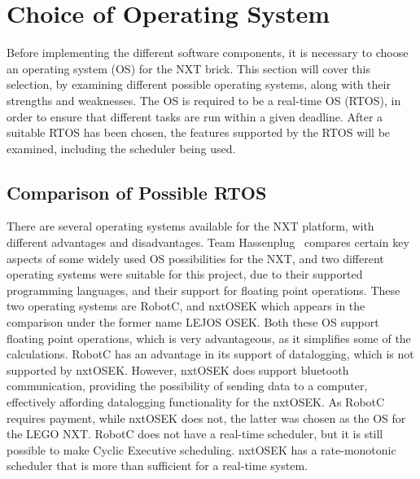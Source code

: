 \section{Choice of Operating System}\label{OS}
Before implementing the different software components, it is necessary to choose an operating system (OS) for the NXT brick. This section will cover this selection, by examining different possible operating systems, along with their strengths and weaknesses. The OS is required to be a real-time OS (RTOS), in order to ensure that different tasks are run within a given deadline. After a suitable RTOS has been chosen, the features supported by the RTOS will be examined, including the scheduler being used. 


\subsection{Comparison of Possible RTOS}\label{osek}
There are several operating systems available for the NXT platform, with different advantages and disadvantages. Team Hassenplug~\cite{OSChoice} compares certain key aspects of some widely used OS possibilities for the NXT, and two different operating systems were suitable for this project, due to their supported programming languages, and their support for floating point operations. These two operating systems are RobotC, and nxtOSEK which appears in the comparison under the former name LEJOS OSEK. Both these OS support floating point operations, which is very advantageous, as it simplifies some of the calculations. RobotC has an advantage in its support of datalogging, which is not supported by nxtOSEK. However, nxtOSEK does support bluetooth communication, providing the possibility of sending data to a computer, effectively affording datalogging functionality for the nxtOSEK. As RobotC requires payment, while nxtOSEK does not, the latter was chosen as the OS for the LEGO NXT. RobotC does not have a real-time scheduler, but it is still possible to make Cyclic Executive scheduling. nxtOSEK has a rate-monotonic scheduler that is more than sufficient for a real-time system.

